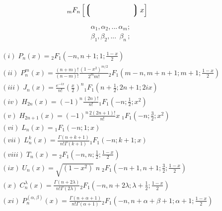 






\[\begin{align*} {}_mF_n \left[ \left\lgroup \qquad\qquad\qquad \right\rgroup x \right] \end{align*}\]

\[\begin{align*} \label{hypergeorows} & \alpha_1, \alpha_2,...\, \alpha_m; \\\ & \beta_1,\beta_2,...\,\; \beta_n\, ; \end{align*}\]

\[\begin{align} & (i)\; P_n(x) = {}_2F_1 \left(-n , n+1 ; 1 ; \frac{1-x}2 \right) \\\ & (ii)\; P_n^m(x) = \frac{(n+m)!}{(n-m)!}\frac{(1-x^2)^{m/2}}{2^mm!}{}_2F_1 \left( m-n , m+n+1 ; m+1 ; \frac{1-x}2 \right) \\\ & (iii)\; J_n(x) = \frac{e^{-ix}}{n!} \left( \frac x2 \right)^n {}_1F_1(n+\tfrac 12 ; 2n+1 ; 2ix) \\\ & (iv)\; H_{2n}(x) = (-1)^n\frac{(2n)!}{n!} {}_1F_1(-n ; \tfrac12 ; x^2) \\\ & (v)\; H_{2n+1}(x) = (-1)^n\frac{2(2n+1)!}{n!}x\; {}_1F_1(-n ; \tfrac32 ; x^2) \\\ & (vi)\; L_n(x) = {}_1F_1(-n ; 1 ; x) \\\ & (vii)\; L_n^k(x) = \frac{\Gamma(n+k+1)}{n!\Gamma(k+1)}{}_1F_1(-n ; k+1 ; x) \\\ & (viii)\; T_n(x) = {}_2F_1 \left(-n , n ; \frac12 ; \frac{1-x}2 \right) \\\ & (ix)\; U_n(x) = \sqrt{(1-x^2)}\; n\; {}_2F_1 \left(-n+1 , n+1 ; \frac32 ; \frac{1-x}2\right) \\\ & (x)\; C_n^\lambda(x) = \frac{\Gamma(n+2\lambda)}{n!\Gamma(2\lambda)}{}_2F_1 \left( -n , n+2\lambda ; \lambda +\tfrac12 ; \frac{1-x}2 \right) \\\ & (xi)\; P_n^{(\alpha,\beta)}(x) = \frac{\Gamma(n+\alpha+1)}{n!\Gamma(\alpha+1)} {}_2F_1\left(-n , n+\alpha+\beta+1 ; \alpha+1 ; \frac{1-x}2\right) \end{align}\]

